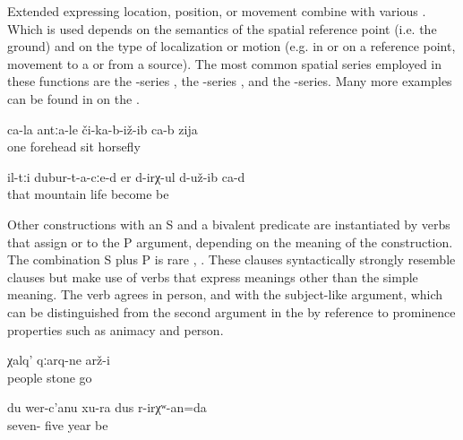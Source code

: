 Extended  expressing location, position, or movement combine with various . Which  is used depends on the semantics of the spatial reference point (i.e. the ground) and on the type of localization or motion (e.g. in or on a reference point, movement to a  or from a source). The most common spatial series employed in these functions are the -series , the -series , and the -series. Many more examples can be found in  on the .
%
\begin{exe}
	\ex	\label{ex:A horsefly sat down on the forehead of one (man)}
	\gll	ca-la	antːa-le	či-ka-b-iž-ib	ca-b	zija\\
		one	forehead	sit		horsefly\\
	\glt	{}

	\ex	\label{ex:(Apparently) they (=the animals) lived in the mountains}
	\gll	il-tːi	dubur-t-a-cːe-d	er	d-irχ-ul	d-už-ib	ca-d\\
		that	mountain	life	become	be \\
	\glt	{}
\end{exe}

Other constructions with an  S and a bivalent predicate are instantiated by verbs that assign  or  to the P argument, depending on the meaning of the construction. The combination  S plus  P is rare , . These clauses syntactically strongly resemble  clauses but make use of verbs that express meanings other than the simple  meaning. The verb agrees in person,  and  with the subject-like argument, which can be distinguished from the second argument in the  by reference to prominence properties such as animacy and person.
%
\begin{exe}
	\ex	\label{ex:The people turned into stones}
	\gll	χalq'	qːarq-ne	arž-i\\
		people	stone	go\\
	\glt	{}

	\ex	\label{ex:I will be 75 years old}
	\gll	du	wer-c'anu	xu-ra	dus	r-irχʷ-an=da\\
			seven-	five year	be\\
	\glt	{}
\end{exe}

